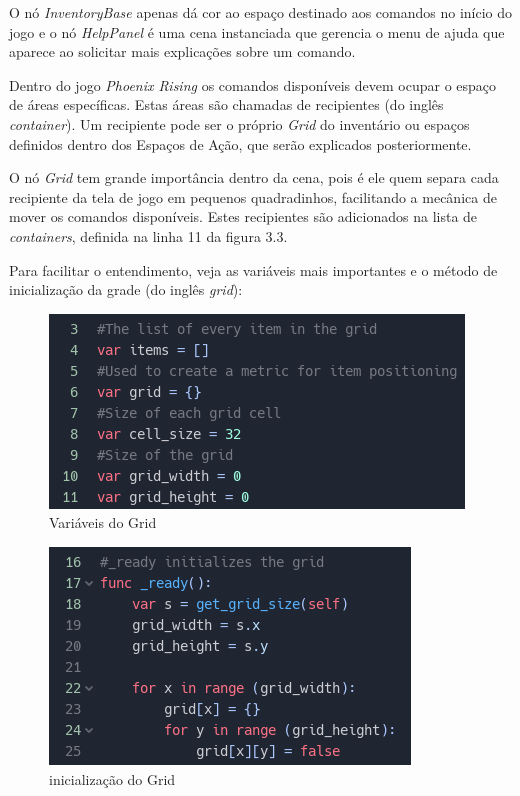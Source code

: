 O nó \textit{InventoryBase} apenas dá cor ao espaço destinado aos comandos no
início do jogo e o nó \textit{HelpPanel} é uma cena instanciada que gerencia o
menu de ajuda que aparece ao solicitar mais explicações sobre um comando.

Dentro do jogo \textit{Phoenix Rising} os comandos disponíveis devem ocupar o
espaço de áreas específicas. Estas áreas são chamadas de recipientes (do 
inglês \textit{container}). Um recipiente pode ser o próprio \textit{Grid} do 
inventário ou espaços definidos dentro dos Espaços de Ação, que serão explicados
posteriormente.

O nó \textit{Grid} tem grande importância dentro da cena, pois é ele quem separa
cada recipiente da tela de jogo em pequenos quadradinhos, facilitando a mecânica
de mover os comandos disponíveis. Estes recipientes são adicionados na lista de 
\textit{containers}, definida na linha 11 da figura 3.3.

Para facilitar o entendimento, veja as variáveis mais importantes e o método de 
inicialização da grade (do inglês \textit{grid}):

\begin{minipage}[c]{0.5\textwidth}
    \begin{figure}[H]
        \includegraphics[scale=0.5]{../figuras/grid_variables.png}
        \caption{Variáveis do Grid}
    \end{figure}
\end{minipage}%
\begin{minipage}[c]{0.6\textwidth}
    \begin{figure}[H]
        \includegraphics[scale=0.6]{../figuras/grid_ini.png}
        \caption{inicialização do Grid}
    \end{figure}
\end{minipage}

